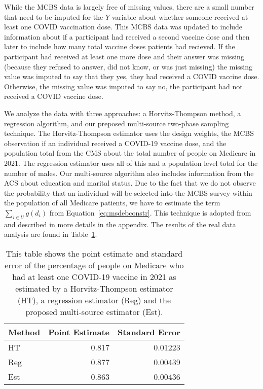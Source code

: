\documentclass[12pt]{article}
\begin{document}
While the MCBS data is largely free of missing values, there are a small number
that need to be imputed for the $Y$ variable about whether someone received at
least one COVID vaccination dose. This MCBS data was updated to include
information about if a participant had received a second vaccine dose and then
later to include how many total vaccine doses patients had recieved. If the
participant had received at least one more dose and their answer was missing (because
they refused to answer, did not know, or was just missing) the missing value was
imputed to say that they yes, they had received a COVID vaccine dose. Otherwise,
the missing value was imputed to say no, the participant had not received a
COVID vaccine dose.

We analyze the data with three approaches: a Horvitz-Thompson method, a
regression algorithm, and our preposed multi-source two-phase sampling technique. 
The Horvitz-Thompson estimator uses the design weights, the MCBS observation if
an individual received a COVID-19 vaccine dose, and the population total from
the CMS about the total number of people on Medicare in 2021. The regression
estimator uses all of this and a population level total for the number of males.
Our multi-source algorithm also includes information from the ACS about
education and marital status. Due to the fact that we do not observe the
probability that an individual will be selected into the MCBS survey within the
population of all Medicare patients, we have to estimate the term 
$\sum_{i \in U} g(d_i)$ from Equation~\ref{eq:msdebconstr}. This technique is
adopted from \cite{kwon2024debiased} and described in more details in the
appendix.
The results of the real data analysis are found in Table~\ref{tab:mcbsres}.

\begin{table}[ht!]
  \centering
  \label{tab:mcbsres}
  \begin{tabular}{lrr}
    \toprule
    Method & Point Estimate & Standard Error \\
    \midrule
    HT  & 0.817 & 0.01223 \\
    Reg & 0.877 & 0.00439 \\
    Est & 0.863 & 0.00436 \\ 
    \bottomrule
  \end{tabular}
  \caption{This table shows the point estimate and standard error of the
  percentage of people on Medicare who had at least one COVID-19 vaccine in
  2021 as estimated by a Horvitz-Thompson estimator (HT), a regression estimator
  (Reg) and the proposed multi-source estimator (Est).}
\end{table}
\end{document}
